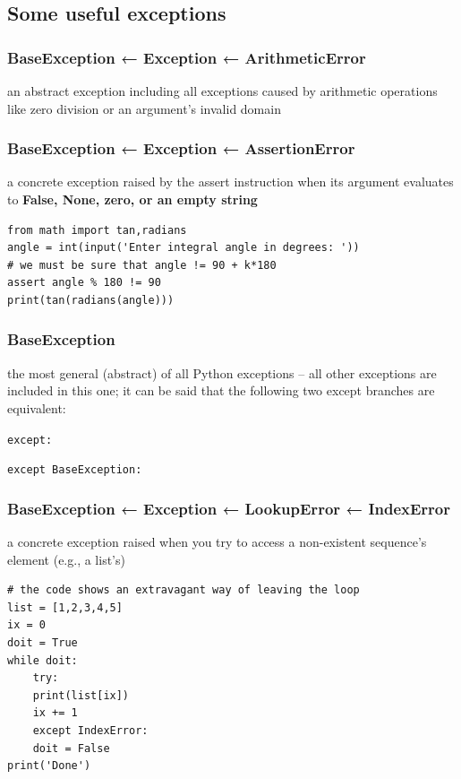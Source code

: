 \documentclass[11pt]{article}
\begin{document}
\subsection{Some useful exceptions}
\label{sec:org069a900}
\subsubsection{BaseException ← Exception ← ArithmeticError}
\label{sec:org2ac25f6}
an abstract exception including all exceptions caused by arithmetic
operations like zero division or an argument’s invalid domain

\subsubsection{BaseException ← Exception ← AssertionError}
\label{sec:org52a8022}
a concrete exception raised by the assert instruction when its
argument evaluates to \textbf{False, None, zero, or an empty string}

\begin{verbatim}
from math import tan,radians
angle = int(input('Enter integral angle in degrees: '))
# we must be sure that angle != 90 + k*180
assert angle % 180 != 90
print(tan(radians(angle)))
\end{verbatim}

\subsubsection{BaseException}
\label{sec:org9b7fc79}
the most general (abstract) of all Python exceptions – all other
exceptions are included in this one; it can be said that the following
two except branches are equivalent:

\texttt{except:}

\texttt{except BaseException:}

\subsubsection{BaseException ← Exception ← LookupError ← IndexError}
\label{sec:org0e3ebfa}
a concrete exception raised when you try to access a non-existent
sequence’s element (e.g., a list’s)

\begin{verbatim}
# the code shows an extravagant way of leaving the loop
list = [1,2,3,4,5]
ix = 0
doit = True
while doit:
    try:
	print(list[ix])
	ix += 1
    except IndexError:
	doit = False
print('Done')
\end{verbatim}
\end{document}
